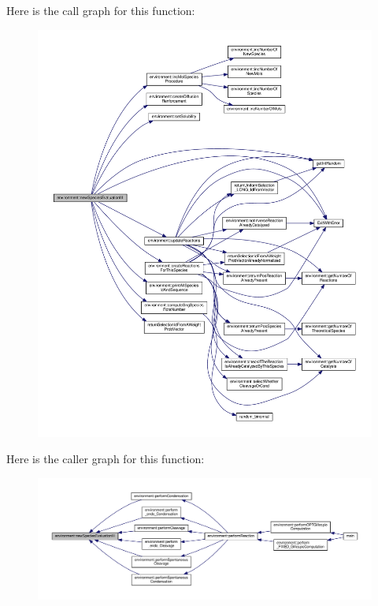 Here is the call graph for this function\-:\nopagebreak
\begin{figure}[H]
\begin{center}
\leavevmode
\includegraphics[width=350pt]{a00011_a4fe7891fb38f3f25bb82769af0ddfe19_cgraph}
\end{center}
\end{figure}




Here is the caller graph for this function\-:\nopagebreak
\begin{figure}[H]
\begin{center}
\leavevmode
\includegraphics[width=350pt]{a00011_a4fe7891fb38f3f25bb82769af0ddfe19_icgraph}
\end{center}
\end{figure}


